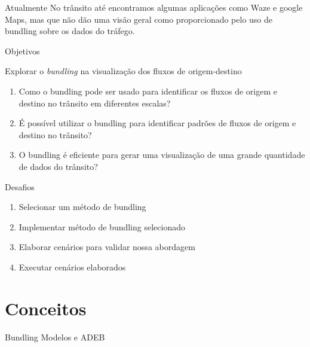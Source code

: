\begin{frame}{Atualmente}
  No trânsito até encontramos algumas aplicações como Waze e google Maps, mas
que não dão uma visão geral como proporcionado pelo uso de bundling sobre
os dados do tráfego.
\end{frame}


\begin{frame}{Objetivos}
  \begin{block}{Explorar o \emph{bundling} na visualização dos fluxos de origem-destino}
    \begin{enumerate}
      \item Como o bundling pode ser usado para identificar os fluxos de origem
      e destino no trânsito em diferentes escalas?

      \item É possível utilizar o bundling para identificar padrões de fluxos
      de origem e destino no trânsito?

      \item O bundling é eficiente para gerar uma visualização de uma grande
      quantidade de dados do trânsito?
    \end{enumerate}
  \end{block}
\end{frame}

\begin{frame}{Desafios}
    \begin{enumerate}
      \item Selecionar um método de bundling

      \item Implementar método de bundling selecionado

      \item Elaborar cenários para validar nossa abordagem

      \item Executar cenários elaborados
    \end{enumerate}
\end{frame}

\section{Conceitos}

\begin{frame}{Bundling}
    Modelos e ADEB
\end{frame}


